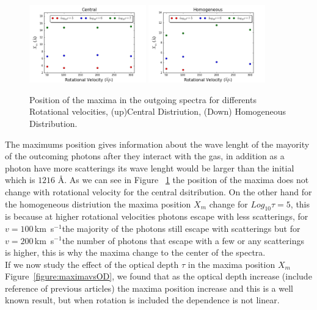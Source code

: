 \documentclass[usenatbib]{mn2e}
\newcommand{\kms}{\,km~s$^{-1}$}
\begin{document}
\begin{figure}
    \includegraphics[width=0.45\textwidth]{maximumvsvelocitiesDifODCentral.png}
    \includegraphics[width=0.45\textwidth]{maximumvsvelocitiesDifODHOM.png}
  \label{figure:maximumsvsvelocities}\caption{Position of the maxima in the outgoing spectra for differents Rotational velocities, (up)Central Distriution, (Down) Homogeneous Distribution.}
\end{figure}

The maximums position gives information about the wave lenght of the
mayority of the outcoming photons after they interact with the gas, in
addition as a photon have more scatterings its wave lenght would be
larger than the initial which is $1216$ {\AA}. 
As we can see in Figure ~\ref{figure:maximumsvsvelocities} the
position of the maxima does not change with rotational velocity for
the central dsitribution. On the other hand for the homogeneous
distriution the maxima position $X_{m}$ change for $Log_{10}\tau=5$,
this is because at higher rotational velocities photons escape with
less scatterings, for $v=100$\kms the majority of the photons
still escape with scatterings but for $v=200$\kms the number
of photons that escape with a few or any scatterings is higher, this
is why the maxima change to the center of the spectra.\\ 

If we now study the effect of the optical depth $\tau$ in the maxima position $X_{m}$ Figure~\ref{figure:maximavsOD}, we found that as the optical depth increase (include reference of previous articles) the maxima position increase and this is a well known result, but when rotation is included the dependence is not linear.
\end{document}
